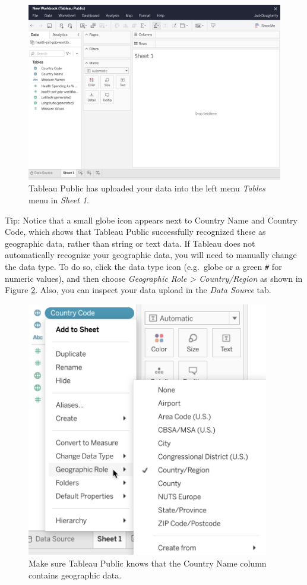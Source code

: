 \documentclass[
  english,
]{book}
\begin{document}
\begin{figure}
\centering
\includegraphics{images/07-map/tableau-sheet.png}
\caption{\label{fig:tableau-sheet}Tableau Public has uploaded your data into the left menu \emph{Tables} menu in \emph{Sheet 1}.}
\end{figure}

Tip: Notice that a small globe icon appears next to Country Name and Country Code, which shows that Tableau Public successfully recognized these as geographic data, rather than string or text data. If Tableau does not automatically recognize your geographic data, you will need to manually change the data type. To do so, click the data type icon (e.g.~globe or a green \texttt{\#} for numeric values), and then choose \emph{Geographic Role \textgreater{} Country/Region} as shown in Figure \ref{fig:tableau-data-geographic}. Also, you can inspect your data upload in the \emph{Data Source} tab.



\begin{figure}
\includegraphics[width=400px]{images/07-map/tableau-data-geographic} \caption{Make sure Tableau Public knows that the Country Name column contains geographic data.}\label{fig:tableau-data-geographic}
\end{figure}
\end{document}
